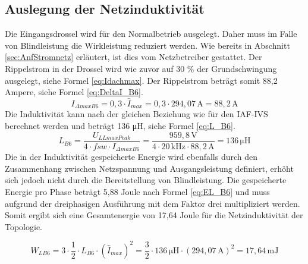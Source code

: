 		\subsection{Auslegung der Netzinduktivität}
				Die Eingangsdrossel wird für den Normalbetrieb ausgelegt. Daher muss im Falle von Blindleistung die Wirkleistung reduziert werden. Wie bereits in Abschnitt \ref{sec:AnfStromnetz} erläutert, ist dies vom Netzbetreiber gestattet. Der Rippelstrom in der Drossel wird wie zuvor auf 30 \% der Grundschwingung ausgelegt, siehe Formel \ref{eq:Idachmax}. Der Rippelstrom beträgt somit 88,2 Ampere, siehe Formel \ref{eq:DeltaI_B6}.\\
			
			\begin{equation}
				\label{eq:DeltaI_B6}
				I_{\Delta max B6}= 0,3 \cdot \hat{I}_{max}= 0,3 \cdot 294,07\, \si{\A} = 88,2\, \si{\A}
			\end{equation}
			Die Induktivität kann nach der gleichen Beziehung wie für den \gls{IAF}-\gls{IVS} berechnet werden und beträgt 136 \si{\micro \henry}, siehe Formel \ref{eq:L_B6}.
			\begin{equation}
				\label{eq:L_B6}
				L_{B6}= \dfrac{U_{LLmaxPeak}}{4\cdot f{sw} \cdot I_{\Delta max B6}} = \dfrac{959,8\, \si{\volt}}{4 \cdot 20\, \si{\kilo \hertz} \cdot 88,2\, \si{\ampere}} =136\, \si{\micro \henry}
			\end{equation}
			Die in der Induktivität gespeicherte Energie wird ebenfalls durch den Zusammenhang zwischen Netzspannung und Ausgangsleistung definiert, erhöht sich jedoch nicht durch die Bereitstellung von Blindleistung. Die gespeicherte Energie pro Phase beträgt 5,88 Joule nach Formel \ref{eq:EL_B6} und muss aufgrund der dreiphasigen Ausführung mit dem Faktor drei multipliziert werden. Somit ergibt sich eine Gesamtenergie von 17,64 Joule für die Netzinduktivität der Topologie.
			
			\begin{equation}
			\label{eq:EL_B6}
			W_{LB6}= 3 \cdot \dfrac{1}{2} \cdot L_{B6} \cdot (\hat{I}_{max})^{2}= \dfrac{3}{2} \cdot 136 \,\si{\micro \henry} \cdot (294,07\, \si{\A})^{2} = 17,64 \, \si{\milli \joule}
			\end{equation}
